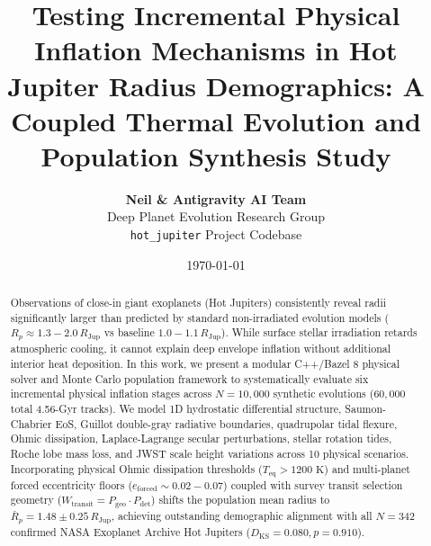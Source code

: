 \documentclass[twocolumn,10pt,a4paper]{article}
\title{\textbf{Testing Incremental Physical Inflation Mechanisms in Hot Jupiter Radius Demographics: A Coupled Thermal Evolution and Population Synthesis Study}}
\author{
  \textbf{Neil \& Antigravity AI Team}\\
  \small Deep Planet Evolution Research Group\\
  \small \texttt{hot\_jupiter} Project Codebase
}
\date{\today}
\begin{document}
\maketitle

\begin{abstract}
Observations of close-in giant exoplanets (Hot Jupiters) consistently reveal radii significantly larger than predicted by standard non-irradiated evolution models ($R_p \approx 1.3 - 2.0\,R_{\mathrm{Jup}}$ vs baseline $1.0 - 1.1\,R_{\mathrm{Jup}}$). While surface stellar irradiation retards atmospheric cooling, it cannot explain deep envelope inflation without additional interior heat deposition. In this work, we present a modular C++/Bazel 8 physical solver and Monte Carlo population framework to systematically evaluate six incremental physical inflation stages across $N = 10,000$ synthetic evolutions ($60,000$ total 4.56-Gyr tracks). We model 1D hydrostatic differential structure, Saumon-Chabrier EoS, Guillot double-gray radiative boundaries, quadrupolar tidal flexure, Ohmic dissipation, Laplace-Lagrange secular perturbations, stellar rotation tides, Roche lobe mass loss, and JWST scale height variations across 10 physical scenarios. Incorporating physical Ohmic dissipation thresholds ($T_{\mathrm{eq}} > 1200\text{ K}$) and multi-planet forced eccentricity floors ($e_{\mathrm{forced}} \sim 0.02 - 0.07$) coupled with survey transit selection geometry ($W_{\mathrm{transit}} = P_{\text{geo}} \cdot P_{\text{det}}$) shifts the population mean radius to $\bar{R}_p = 1.48 \pm 0.25\,R_{\mathrm{Jup}}$, achieving outstanding demographic alignment with all $N = 342$ confirmed NASA Exoplanet Archive Hot Jupiters ($D_{\mathrm{KS}} = 0.080, p = 0.910$).
\end{abstract}








\end{document}
